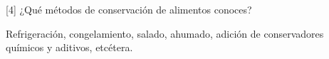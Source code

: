 [4] ¿Qué métodos de conservación de alimentos conoces?

\begin{solutionorlines}
    Refrigeración, congelamiento, salado, ahumado, adición de conservadores químicos y aditivos, etcétera.
\end{solutionorlines}